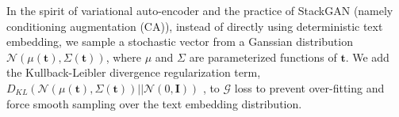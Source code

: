 \documentclass[10pt,twocolumn,letterpaper]{article}
\begin{document}
In the spirit of variational auto-encoder \cite{vae} and the practice of StackGAN \cite{han2017stackgan} (namely conditioning augmentation (CA)), instead of directly using deterministic text embedding, we sample a stochastic vector from a Ganssian distribution $\mathcal{N}(\mu({\bm t}), \Sigma({\bm t}))$, where $\mu$ and $\Sigma$ are parameterized functions of $\bm t$. 
We add the Kullback-Leibler divergence regularization term, $D_{KL}(\mathcal{N}(\mu({\bm t}), \Sigma({\bm t}) )|| \mathcal{N}(0, \bm{I}))$ \cite{vae}, to $\mathcal{G}$ loss to prevent over-fitting and force smooth sampling over the text embedding distribution.











\end{document}
